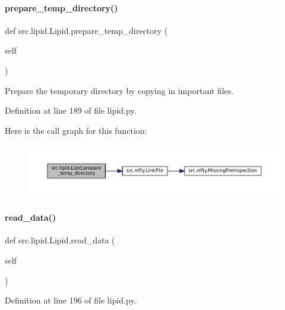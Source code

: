 \paragraph{\texorpdfstring{prepare\+\_\+temp\+\_\+directory()}{prepare\_temp\_directory()}}
{\footnotesize\ttfamily def src.\+lipid.\+Lipid.\+prepare\+\_\+temp\+\_\+directory (\begin{DoxyParamCaption}\item[{}]{self }\end{DoxyParamCaption})}



Prepare the temporary directory by copying in important files. 



Definition at line 189 of file lipid.\+py.

Here is the call graph for this function\+:
\nopagebreak
\begin{figure}[H]
\begin{center}
\leavevmode
\includegraphics[width=350pt]{classsrc_1_1lipid_1_1Lipid_a0571b5cf5b10a169eb7afee468dd3a61_cgraph}
\end{center}
\end{figure}
\mbox{\label{classsrc_1_1lipid_1_1Lipid_a3b13700c93a2c711749c535a04f59008}} 
\paragraph{\texorpdfstring{read\+\_\+data()}{read\_data()}}
{\footnotesize\ttfamily def src.\+lipid.\+Lipid.\+read\+\_\+data (\begin{DoxyParamCaption}\item[{}]{self }\end{DoxyParamCaption})}



Definition at line 196 of file lipid.\+py.

\mbox{\label{classsrc_1_1lipid_1_1Lipid_add85e5fe4603baf97f3f2d0ef2647d0e}} 
